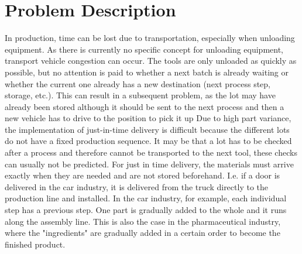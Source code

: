 \section{Problem Description}
\label{sec:ProblemDescription}
In production, time can be lost due to transportation, especially when unloading equipment. As there is currently no specific concept for unloading equipment, transport vehicle congestion can occur. The tools are only unloaded as quickly as possible, but no attention is paid to whether a next batch is already waiting or whether the current one already has a new destination (next process step, storage, etc.). This can result in a subsequent problem, as the lot may have already been stored although it should be sent to the next process and then a new vehicle has to drive to the position to pick it up 
Due to high part variance, the implementation of just-in-time delivery is difficult because the different lots do not have a fixed production sequence. It may be that a lot has to be checked after a process and therefore cannot be transported to the next tool, these checks can usually not be predicted.
For just in time delivery, the materials must arrive exactly when they are needed and are not stored beforehand.
I.e. if a door is delivered in the car industry, it is delivered from the truck directly to the production line and installed.
In the car industry, for example, each individual step has a previous step. One part is gradually added to the whole and it runs along the assembly line. This is also the case in the pharmaceutical industry, where the "ingredients" are gradually added in a certain order to become the finished product.\\


% 